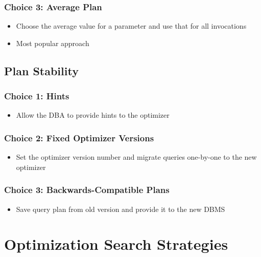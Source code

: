\documentclass[11pt]{article}
\begin{document}
        \subsubsection*{Choice 3: Average Plan}
        \begin{itemize}
            \item Choose the average value for a parameter and use that for all invocations
            \item Most popular approach
        \end{itemize}

    \subsection*{Plan Stability}

        \subsubsection*{Choice 1: Hints}
        \begin{itemize}
            \item Allow the DBA to provide hints to the optimizer
        \end{itemize}

        \subsubsection*{Choice 2: Fixed Optimizer Versions}
        \begin{itemize}
            \item Set the optimizer version number and migrate queries one-by-one to the new optimizer
        \end{itemize}

        \subsubsection*{Choice 3: Backwards-Compatible Plans}
        \begin{itemize}
            \item Save query plan from old version and provide it to the new DBMS
        \end{itemize}



\section{Optimization Search Strategies}
\end{document}
